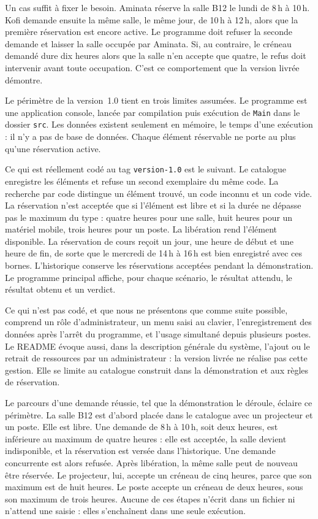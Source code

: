 \documentclass[11pt,a4paper]{article}
\begin{document}
Un cas suffit à fixer le besoin. Aminata réserve la salle B12 le lundi de 8\,h à 10\,h. Kofi demande ensuite la même salle, le même jour, de 10\,h à 12\,h, alors que la première réservation est encore active. Le programme doit refuser la seconde demande et laisser la salle occupée par Aminata. Si, au contraire, le créneau demandé dure dix heures alors que la salle n'en accepte que quatre, le refus doit intervenir avant toute occupation. C'est ce comportement que la version livrée démontre.

Le périmètre de la version~1.0 tient en trois limites assumées. Le programme est une application console, lancée par compilation puis exécution de \texttt{Main} dans le dossier \texttt{src}. Les données existent seulement en mémoire, le temps d'une exécution : il n'y a pas de base de données. Chaque élément réservable ne porte au plus qu'une réservation active.

Ce qui est réellement codé au tag \texttt{version-1.0} est le suivant. Le catalogue enregistre les éléments et refuse un second exemplaire du même code. La recherche par code distingue un élément trouvé, un code inconnu et un code vide. La réservation n'est acceptée que si l'élément est libre et si la durée ne dépasse pas le maximum du type : quatre heures pour une salle, huit heures pour un matériel mobile, trois heures pour un poste. La libération rend l'élément disponible. La réservation de cours reçoit un jour, une heure de début et une heure de fin, de sorte que le mercredi de 14\,h à 16\,h est bien enregistré avec ces bornes. L'historique conserve les réservations acceptées pendant la démonstration. Le programme principal affiche, pour chaque scénario, le résultat attendu, le résultat obtenu et un verdict.

Ce qui n'est pas codé, et que nous ne présentons que comme suite possible, comprend un rôle d'administrateur, un menu saisi au clavier, l'enregistrement des données après l'arrêt du programme, et l'usage simultané depuis plusieurs postes. Le README évoque aussi, dans la description générale du système, l'ajout ou le retrait de ressources par un administrateur : la version livrée ne réalise pas cette gestion. Elle se limite au catalogue construit dans la démonstration et aux règles de réservation.

Le parcours d'une demande réussie, tel que la démonstration le déroule, éclaire ce périmètre. La salle B12 est d'abord placée dans le catalogue avec un projecteur et un poste. Elle est libre. Une demande de 8\,h à 10\,h, soit deux heures, est inférieure au maximum de quatre heures : elle est acceptée, la salle devient indisponible, et la réservation est versée dans l'historique. Une demande concurrente est alors refusée. Après libération, la même salle peut de nouveau être réservée. Le projecteur, lui, accepte un créneau de cinq heures, parce que son maximum est de huit heures. Le poste accepte un créneau de deux heures, sous son maximum de trois heures. Aucune de ces étapes n'écrit dans un fichier ni n'attend une saisie : elles s'enchaînent dans une seule exécution.
\end{document}
